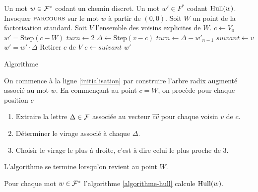 \begin{algorithm}
	\fontsize{10}{10}\selectfont
	\begin{algorithmic}[1]
	\Require Un mot $w \in \mathcal{F}^*$ codant un chemin discret.
	\Ensure Un mot $w' \in F^*$ codant $\text{Hull}(w)$.
		\State Invoquer $\text{\scshape parcours}$ sur le mot $w$ à partir de $(0,0)$. \label{initialisation}
		\State Soit $W$ un point de la factorisation standard. \label{c1a}
		\State Soit $V$ l'ensemble des voisins explicites de $W$. \label{c1b}
		\State $c \gets V_0$ \label{c1c}
		\State $w' = \text{Step}(c-W)$ \label{w'initialise} \label{c1d}
		\label{boucle}
			\State $turn \gets 2$
			\label{pour-chaque-voisin}
				\State $\Delta \gets \text{Step}(v-c)$
					\State $turn \gets \Delta - w'_{n-1}$
					\State $suivant \gets v$
				\EndIf
			\EndFor \label{pour-chaque-voisin-fin}
			\State $w' = w' \cdot \Delta$ \label{grow-w'}
			\State Retirer $c$ de $V$ \label{vider-grand-V}
			\State $c \gets suivant$
		\EndWhile
		\State \Return $w'$
	\EndFunction
	\end{algorithmic}
\caption{Algorithme \HULL}\label{algorithme-hull}
\end{algorithm}

On commence à la ligne \ref{initialisation} par construire l'arbre radix augmenté associé au mot $w$. En commençant au point $c=W$, on procède pour chaque position $c$
\begin{enumerate}
\item Extraire la lettre $\Delta\in\mathcal{F}$ associée au vecteur $\vec{cv}$ pour chaque voisin $v$ de $c$.
\item Déterminer le virage associé à chaque $\Delta$.
\item Choisir le virage le plus à droite, c'est à dire celui le plus proche de $3$.
\end{enumerate}
L'algorithme se termine lorsqu'on revient au point $W$.

\begin{theorem} Pour chaque mot $w\in\mathcal{F}^*$ l'algorithme \ref{algorithme-hull} calcule $\text{Hull}(w)$.
\end{theorem}

